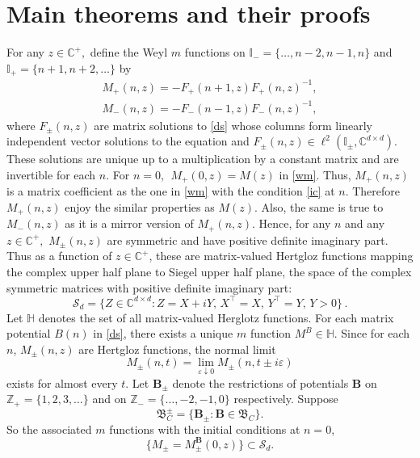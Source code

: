 \documentclass[reqno]{amsart}
\numberwithin{equation}{section}
\newcommand{\C}{\mathbb{C}}
\newcommand{\Z}{\mathbb{Z}}
\begin{document}
\section{ Main theorems and their proofs } \label{mainth}
  For any $z\in \C^+, $ define the Weyl $m$ functions on $ \mathbb I_- = \{ \dots, n-2, n-1, n\}$ and $ \mathbb I_+ =\{n+1, n+2,  \dots\}$ by	
\begin{align} \label{wmf}
	M_+(n,z)  = - F_+(n+1,z)  F_+(n,z)^{-1},\\ \nonumber  M_-(n,z)  = - F_-(n-1,z)  F_-(n,z)^{-1},
\end{align}
where $F_{\pm}(n,z)$ are matrix  solutions to \eqref{ds} whose columns form   linearly independent vector solutions to the equation and  $F_{\pm}(n,z)\in\ell^2(\mathbb I _{\pm},\C^{d \times d}).$ These solutions are unique up to a multiplication by a constant matrix and are invertible for  each $n$. For $n=0, \ \	M_+(0,z)  = M(z)$ in \eqref{wm}. Thus, $M_+(n,z)$ is a matrix coefficient  as   the one in \eqref{wm} with the condition \eqref{ic} at $n$. Therefore $M_+(n,z)$ enjoy the similar properties as $ M(z)$.    Also, the same is true to $M_-(n,z) $  as it is a mirror version of $M_+(n,z)$. Hence, for any $n$ and any $z \in \C^+, $  $M_{\pm}(n, z) $ are symmetric and  have positive definite imaginary part.   Thus as a function of $z\in \C^+$, these are matrix-valued Hertgloz functions  mapping the complex upper half plane to Siegel upper half plane, the  space of the complex symmetric matrices with positive definite imaginary part: 
\begin{equation*}
	\mathcal{S}_d = \{Z\in\C^{d \times d} : Z = X +iY,\, X^\top=X,\, Y^\top = Y,\, Y> 0 \}\,.
\end{equation*}
Let $ \mathbb H$ denotes the set of all  matrix-valued Herglotz functions. For each matrix potential $B(n)$ in \eqref{ds}, there exists a unique $m$ function $M^B \in \mathbb H .$
Since for each $n$,   $ M_{\pm}(n, z)$ are Hertgloz functions, 
 the normal limit 
\begin{equation*}
	M_{\pm}( n, t) = \lim_{\varepsilon\downarrow 0} M_{\pm}(n, t \pm i\varepsilon)
\end{equation*} 
exists for almost every $t.$ Let  $\mathbf B_{\pm}$ denote the restrictions of   potentials $\mathbf B $  on     $   \Z_+ = \{1, 2, 3, \hdots \}$ and on $  \Z_-=\{ \hdots, -2, -1, 0 \}$ respectively. Suppose
$$
\mathfrak B_C^{\pm} =\{ \mathbf B_{\pm}: \mathbf B\in \mathfrak B_C \} .
$$  
 So the associated $m$ functions with the initial conditions at $n=0$,  
 $$\{ M_{\pm} =  M_{\pm}^ \mathbf B (0, z) \} \subset \mathcal S_d .$$
 
\end{document}

